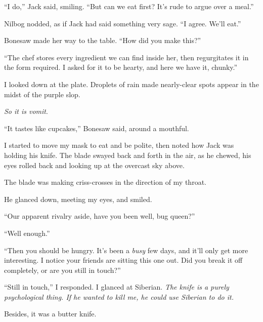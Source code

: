 ``I do,'' Jack said, smiling.  ``But can we eat first?  It's rude to argue over a meal.''



Nilbog nodded, as if Jack had said something very sage.  ``I agree.  We'll eat.''



Bonesaw made her way to the table.  ``How did you make this?''



``The chef stores every ingredient we can find inside her, then regurgitates it in the form required.  I asked for it to be hearty, and here we have it, chunky.''



I looked down at the plate.  Droplets of rain made nearly-clear spots appear in the midst of the purple slop.



\emph{So it is vomit}.



``It tastes like cupcakes,'' Bonesaw said, around a mouthful.



I started to move my mask to eat and be polite, then noted how Jack was holding his knife.  The blade swayed back and forth in the air, as he chewed, his eyes rolled back and looking up at the overcast sky above.



The blade was making criss-crosses in the direction of my throat.



He glanced down, meeting my eyes, and smiled.



``Our apparent rivalry aside, have you been well, bug queen?''



``Well enough.''



``Then you should be hungry.  It's been a \emph{busy} few days, and it'll only get more interesting.  I notice your friends are sitting this one out.  Did you break it off completely, or are you still in touch?''



``Still in touch,'' I responded.  I glanced at Siberian.  \emph{The knife is a purely psychological thing.  If he wanted to kill me, he could use Siberian to do it.}



Besides, it was a butter knife.



